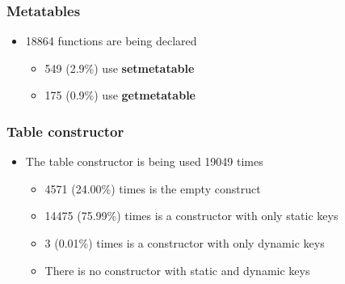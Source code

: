\documentclass{beamer}
\begin{document}
\begin{frame}
\frametitle{Metatables}
\begin{itemize}
\item 18864 functions are being declared
\begin{itemize}
\item 549 (2.9\%) use \textbf{setmetatable}
\item 175 (0.9\%) use \textbf{getmetatable}
\end{itemize}
\end{itemize}
\end{frame}

\begin{frame}
\frametitle{Table constructor}
\begin{itemize}
\item The table constructor is being used 19049 times
\begin{itemize}
\item 4571 (24.00\%) times is the empty construct
\item 14475 (75.99\%) times is a constructor with only static keys
\item 3 (0.01\%) times is a constructor with only dynamic keys
\item There is no constructor with static and dynamic keys
\end{itemize}
\end{itemize}
\end{frame}
\end{document}
